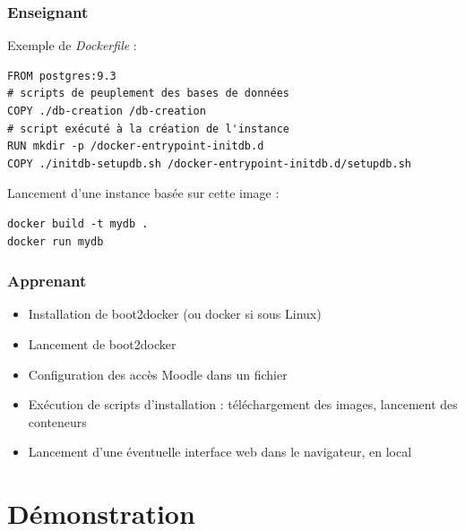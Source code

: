 \documentclass[10pt, compress]{beamer}
\begin{document}
\begin{frame}[fragile]
  \frametitle{Enseignant}

  Exemple de \emph{Dockerfile} :

  \begin{verbatim}
FROM postgres:9.3
# scripts de peuplement des bases de données
COPY ./db-creation /db-creation
# script exécuté à la création de l'instance
RUN mkdir -p /docker-entrypoint-initdb.d
COPY ./initdb-setupdb.sh /docker-entrypoint-initdb.d/setupdb.sh
  \end{verbatim}
  
  Lancement d'une instance basée sur cette image :
  
    \begin{verbatim}
docker build -t mydb .
docker run mydb
  \end{verbatim}
  
\end{frame}

\begin{frame}[fragile]
  \frametitle{Apprenant}

  \begin{itemize}[<+- | alert@+>]
      \item Installation de boot2docker (ou docker si sous Linux)
      \item Lancement de boot2docker
      \item Configuration des accès Moodle dans un fichier
      \item Exécution de scripts d'installation : téléchargement des images, lancement des conteneurs
      \item Lancement d'une éventuelle interface web dans le navigateur, en local
    \end{itemize}
  
\end{frame}


\section{Démonstration}

\end{document}
